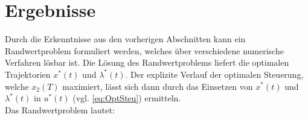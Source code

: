 %

\section{Ergebnisse}
Durch die Erkenntnisse aus den vorherigen Abschnitten kann ein Randwertproblem formuliert werden, welches über verschiedene numerische Verfahren lösbar ist. Die Lösung des Randwertproblems liefert die optimalen Trajektorien $x^*(t)$ und $\lambda^*(t)$. Der explizite Verlauf der optimalen Steuerung, welche $x_2(T)$ maximiert, lässt sich dann durch das Einsetzen von $x^*(t)$ und $\lambda^*(t)$ in $u^*(t)$ (vgl. \autoref{eq:OptSteu}) ermitteln. 
\pagebreak
\\Das Randwertproblem lautet: 

